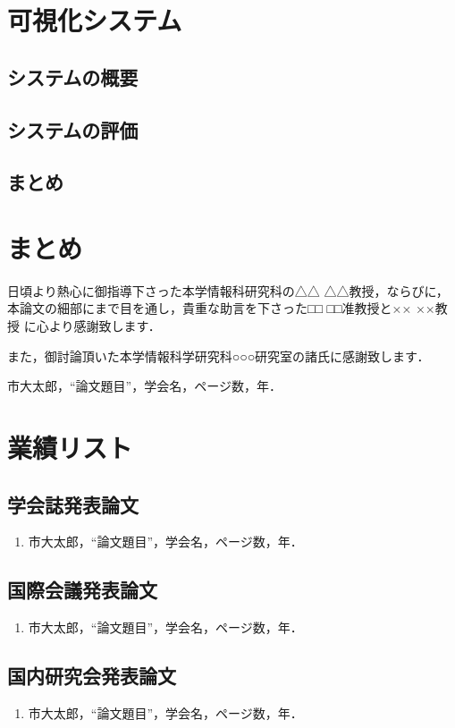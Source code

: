 \documentclass[12pt]{mthesis_utf8}\usepackage{graphicx}
\begin{document}
\chapter{可視化システム}
\section{システムの概要}
\section{システムの評価}
\section{まとめ}

\chapter{まとめ}




\begin{acknowledgment}
日頃より熱心に御指導下さった本学情報科研究科の△△ △△教授，ならびに，
本論文の細部にまで目を通し，貴重な助言を下さった□□ □□准教授と×× ××教授
に心より感謝致します．

また，御討論頂いた本学情報科学研究科○○○研究室の諸氏に感謝致します．
\end{acknowledgment}


%
\begin{thebibliography}{99}
市大太郎，“論文題目”，学会名，ページ数，年．
%
\end{thebibliography}
%
\chapter*{業績リスト}

\section*{学会誌発表論文}
\begin{enumerate}
%
\item 市大太郎，“論文題目”，学会名，ページ数，年．
%
\end{enumerate}

\section*{国際会議発表論文}
\begin{enumerate}
%
\item 市大太郎，“論文題目”，学会名，ページ数，年．
%
\end{enumerate}

\section*{国内研究会発表論文}
\begin{enumerate}
%
\item 市大太郎，“論文題目”，学会名，ページ数，年．
%
\end{enumerate}
%
\end{document}
